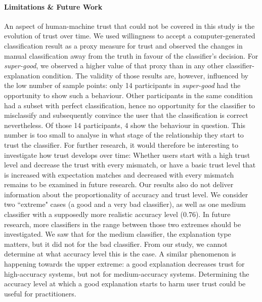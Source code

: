 \paragraph{Limitations \& Future Work}
An aspect of human-machine trust that could not be covered in this study is the evolution of trust over time. We used willingness to accept a computer-generated classification result as a proxy measure for trust and observed the changes in manual classification away from the truth in favour of the classifier's decision. For \textit{super-good}, we observed a higher value of that proxy than in any other classifier-explanation condition. The validity of those results are, however, influenced by the low number of sample points: only 14 participants in \textit{super-good} had the opportunity to show such a behaviour. Other participants in the same condition had a subset with perfect classification, hence no opportunity for the classifier to misclassify and subsequently convince the user that the classification is correct nevertheless. Of those 14 participants, 4 show the behaviour in question. This number is too small to analyse in what stage of the relationship they start to trust the classifier. For further research, it would therefore be interesting to investigate how trust develops over time: Whether users start with a high trust level and decrease the trust with every mismatch, or have a basic trust level that is increased with expectation matches and decreased with every mismatch remains to be examined in future research.\newline
Our results also do not deliver information about the proportionality of accuracy and trust level. We consider two ``extreme" cases (a good and a very bad classifier), as well as one medium classifier with a supposedly more realistic accuracy level (0.76). In future research, more classifiers in the range between those two extremes should be investigated. We saw that for the medium classifier, the explanation type matters, but it did not for the bad classifier. From our study, we cannot determine at what accuracy level this is the case. A similar phenomenon is happening towards the upper extreme: a good explanation decreases trust for high-accuracy systems, but not for medium-accuracy systems. Determining the accuracy level at which a good explanation starts to harm user trust could be useful for practitioners.\newline
